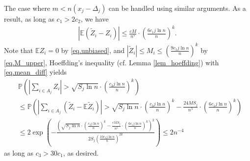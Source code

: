\documentclass[final,12pt]{colt2018} %
\def \bP {\mathbb{P}}
\def \bE {\mathbb{E}}
\begin{document}
The case where $m<n(x_j-\Delta_j)$ can be handled using similar arguments. As a result, as long as $c_1>2c_2$, we have
\begin{align}\label{eq.mean_diff}
|\bE (\tilde{Z}_i-Z_i)| \le \frac{cM}{n^5}\cdot \left(\frac{6c_1j\ln n}{n}\right)^k.
\end{align}
Note that $\bE Z_i=0$ by \eqref{eq.unbiased}, and $|\tilde{Z}_i|\le M_i\le \left(\frac{9c_1j\ln n}{n}\right)^k$ by \eqref{eq.M_upper}, Hoeffding's inequality (cf. Lemma \ref{lem_hoeffding}) with \eqref{eq.mean_diff} yields
\begin{align*}
&\bP\left(\left|\sum_{i\in A_j} Z_i\right| > \sqrt{S_j\ln n}\cdot \left(\frac{c_3j\ln n}{n}\right)^{k}\right) \nonumber \\
&\le \bP\left(\left|\sum_{i\in A_j} (\tilde{Z}_i-\bE \tilde{Z}_i)\right| > \sqrt{S_j\ln n}\cdot \left(\frac{c_3j\ln n}{n}\right)^{k} - \frac{24MS_j}{n^5}\cdot \left(\frac{6c_1j\ln n}{n}\right)^k\right) \\
&\le 2\exp\left(-\frac{\left(\sqrt{S_j\ln n}\cdot \left(\frac{c_3j\ln n}{n}\right)^{k} - \frac{cMS_j}{n^5}\cdot \left(\frac{6c_1j\ln n}{n}\right)^k\right)^2}{2S_j\left(\frac{10c_1j\ln n}{n}\right)^{2k}}\right) \le 2n^{-4}
\end{align*}
as long as $c_3>30c_1$, as desired. 
\end{document}

